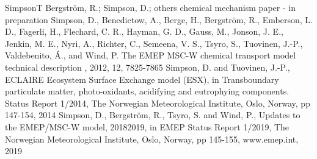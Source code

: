 \documentclass[a4paper,10pt,english]{sphinxmanual}
\begin{document}
\begin{sphinxthebibliography}{SimpsonT}
Bergström, R.; Simpson, D.; others
chemical mechanism paper - in preparation
Simpson, D., Benedictow, A., Berge, H., Bergström, R., Emberson, L.
D., Fagerli, H., Flechard, C. R., Hayman, G. D., Gauss, M., Jonson,
J. E., Jenkin, M. E., Nyri, A., Richter, C., Semeena, V. S., Tsyro,
S., Tuovinen, J.-P., Valdebenito, Á., and Wind, P. The EMEP MSC-W
chemical transport model \textendash{} technical description , 2012, 12, 7825-7865
Simpson, D. and Tuovinen, J.-P., ECLAIRE Ecosystem Surface Exchange
model (ESX), in Transboundary particulate matter, photo-oxidants,
acidifying and eutrophying components. Status Report 1/2014, The Norwegian
Meteorological Institute, Oslo, Norway, pp 147-154, 2014
Simpson, D., Bergström, R., Tsyro, S. and Wind, P.,
Updates to the EMEP/MSC-W model, 2018\textendash{}2019, in EMEP Status Report 1/2019,
The Norwegian Meteorological Institute, Oslo, Norway, pp 145-155, www.emep.int, 2019
\end{sphinxthebibliography}



\renewcommand{\indexname}{Index}
\printindex
\end{document}
